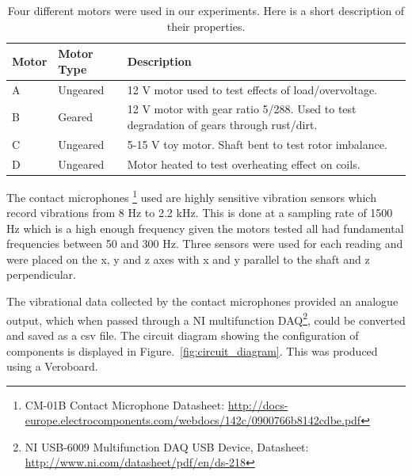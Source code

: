 \begin{table}[]
    \centering
    \begin{tabular}{|p{1cm}|p{1cm}|p{10cm}|}
    \hline
    \textbf{Motor}          & \textbf{Motor Type}        & \textbf{Description}                                                                          \\ \hline
    \multicolumn{1}{|l|}{A} & \multicolumn{1}{l|}{Ungeared} & 12 V motor used to test effects of load/overvoltage.                            \\
    \multicolumn{1}{|l|}{B} & \multicolumn{1}{l|}{Geared} & 12 V motor with gear ratio 5/288. Used to test degradation of gears through rust/dirt. \\
    \multicolumn{1}{|l|}{C} & \multicolumn{1}{l|}{Ungeared} & 5-15 V toy motor. Shaft bent to test rotor imbalance.                                \\
    \multicolumn{1}{|l|}{D} & \multicolumn{1}{l|}{Ungeared}   & Motor heated to test overheating effect on coils.                          \\ \hline
    \end{tabular}
    \caption[Motor Descriptions]{Four different motors were used in our experiments. Here is a short description of their properties.}
    \label{motor_table}
\end{table}


    
The contact microphones \footnote{CM-01B Contact Microphone Datasheet: \url{http://docs-europe.electrocomponents.com/webdocs/142c/0900766b8142cdbe.pdf}} used are highly sensitive vibration sensors which record vibrations from 8 Hz to 2.2 kHz. This is done at a sampling rate of 1500 Hz which is a high enough frequency given the motors tested all had fundamental frequencies between 50 and 300 Hz. Three sensors were used for each reading and were placed on the x, y and z axes with x and y parallel to the shaft and z perpendicular. 

The vibrational data collected by the contact microphones provided an analogue output, which when passed through a NI multifunction DAQ\footnote{NI USB-6009  Multifunction DAQ USB Device, Datasheet: \url{http://www.ni.com/datasheet/pdf/en/ds-218}}, could be converted and saved as a csv file. The circuit diagram showing the configuration of components is displayed in Figure.~\ref{fig:circuit_diagram}. This was produced using a Veroboard.


